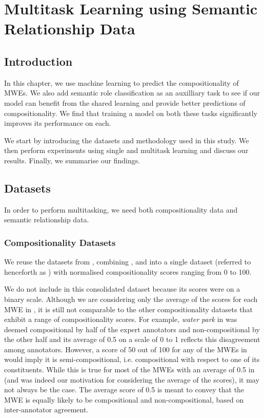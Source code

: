 \chapter{Multitask Learning using Semantic Relationship Data}

\section{Introduction}
In this chapter, we use machine learning to predict the compositionality of MWEs. We also add semantic role classification as an auxilliary task to see if our model can benefit from the shared learning and provide better predictions of compositionality. We find that training a model on both these tasks significantly improves its performance on each.

We start by introducing the datasets and methodology used in this study. We then perform experiments using single and multitask learning and discuss our results. Finally, we summarise our findings.
\section{Datasets}
In order to perform multitasking, we need both compositionality data and semantic relationship data. 
\subsection{Compositionality Datasets}
We reuse the datasets from , combining \reddy, \ramisch and \discoj into a single dataset (referred to henceforth as \comp) with normalised compositionality scores ranging from 0 to 100.

We do not include \farahm in this consolidated dataset because its scores were on a binary scale. Although we are considering only the average of the scores for each MWE in \farahm, it is still not comparable to the other compositionality datasets that exhibit a range of compositionality scores. For example, \textit{water park} in \farahm was deemed compositional by half of the expert annotators and non-compositional by the other half and its average of 0.5 on a scale of 0 to 1 reflects this disagreement among annotators. However, a score of 50 out of 100 for any of the MWEs in \comp would imply it is semi-compositional, i.e. compositional with respect to one of its constituents. While this is true for most of the MWEs with an average of 0.5 in \farahm (and was indeed our motivation for considering the average of the scores), it may not always be the case. The average score of 0.5 is meant to convey that the MWE is equally likely to be compositional and non-compositional, based on inter-annotator agreement.

